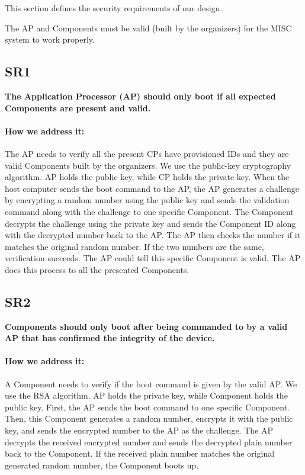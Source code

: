 \documentclass[11pt,oneside,onecolumn,letterpaper]{article}
\newcounter{alg}
\begin{document}
This section defines the security requirements of our design.

The AP and Components must be valid (built by the organizers) for the MISC system to work properly.

\subsection{SR1}
\textbf{The Application Processor (AP) should only boot if all expected Components are present and valid.}
\paragraph{How we address it:}
The AP needs to verify all the present CPs have provisioned IDs and they are valid Components built by the organizers.
We use the public-key cryptography algorithm.
AP holds the public key,
while CP holds the private key.
When the host computer sends the boot command to the AP,
the AP generates a challenge by encrypting a random number using the public key and sends the validation command along with the challenge to one specific Component.
The Component decrypts the challenge using the private key and sends the Component ID along with the decrypted number back to the AP.
The AP then checks the number if it matches the original random number.
If the two numbers are the same,
verification succeeds.
The AP could tell this specific Component is valid.
The AP does this process to all the presented Components.

\subsection{SR2}
\textbf{Components should only boot after being commanded to by a valid AP that has confirmed the integrity of the device.}
\paragraph{How we address it:}
A Component needs to verify if the boot command is given by the valid AP.
We use the RSA algorithm.
AP holds the private key,
while Component holds the public key.
First, the AP sends the boot command to one specific Component.
Then,
this Component generates a random number,
encrypts it with the public key,
and sends the encrypted number to the AP as the challenge.
The AP decrypts the received encrypted number and sends the decrypted plain number back to the Component.
If the received plain number matches the original generated random number,
the Component boots up.
\end{document}
